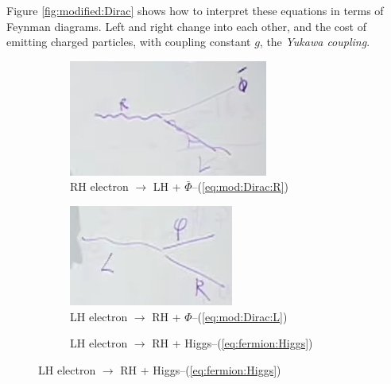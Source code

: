 \documentclass[]{article}
\begin{document}
 Figure \ref{fig:modified:Dirac} shows how to interpret these equations in terms of Feynman diagrams. Left and right change into each other, and the cost of emitting charged particles, with coupling constant $g$, the \emph{Yukawa coupling}.
 \begin{figure}[H]
 	\caption{Interpretation of modified Dirac equation}\label{fig:modified:Dirac}
 	\begin{subfigure}[t]{0.3\textwidth}
 		\caption{RH electron $\rightarrow$ LH + $\bar{\Phi}$--(\ref{eq:mod:Dirac:R})}
 		\includegraphics[width=\textwidth]{2-9-RH}
 	\end{subfigure}
  	\begin{subfigure}[t]{0.3\textwidth}
  		\caption{LH electron $\rightarrow$ RH + $\Phi$--(\ref{eq:mod:Dirac:L})}
	 	\includegraphics[width=\textwidth]{2-9-LH}
	 \end{subfigure}
   	\begin{subfigure}[t]{0.3\textwidth}
 	\caption{LH electron $\rightarrow$ RH + Higgs--(\ref{eq:fermion:Higgs})}\label{fig:2-9-Higgs-boson}

\end{subfigure}
\end{figure}
\end{document}
